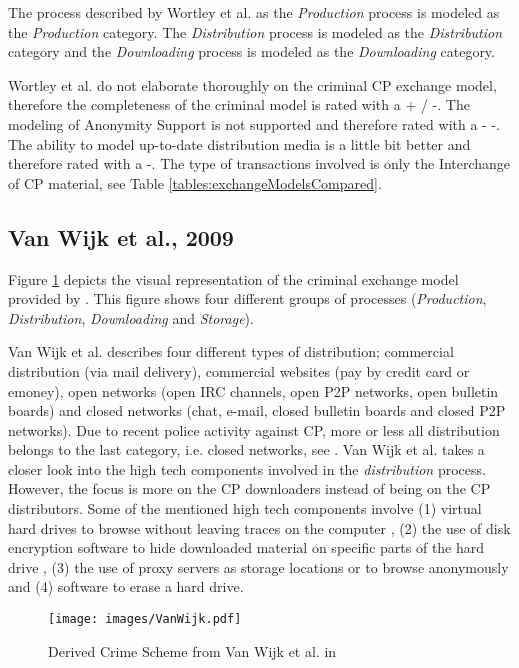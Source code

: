 \documentclass{sig-alternate-br}
\begin{document}
The process described by Wortley et al. as the \textit{Production} process is modeled as the \textit{Production} category. The \textit{Distribution} process is modeled as the \textit{Distribution} category and the \textit{Downloading} process is modeled as the \textit{Downloading} category.

Wortley et al. do not elaborate thoroughly on the criminal CP exchange model, therefore the completeness of the criminal model is rated with a + / -. The modeling of Anonymity Support is not supported and therefore rated with a - -. The ability to model up-to-date distribution media is a little bit better and therefore rated with a -.  The type of transactions involved is only the Interchange of CP material, see Table \ref{tables:exchangeModelsCompared}.

\subsection{Van Wijk et al., 2009 \cite{wijk2009achter}}
Figure \ref{fig:wijk_01} depicts the visual representation of the criminal exchange model provided by \cite{wijk2009achter}. This figure shows four different groups of processes (\textit{Production}, \textit{Distribution}, \textit{Downloading} and \textit{Storage}).

Van Wijk et al. \cite{wijk2009achter} describes four different types of distribution; commercial distribution (via mail delivery), commercial websites (pay by credit card or emoney), open networks (open IRC channels, open P2P networks, open bulletin boards) and closed networks (chat, e-mail, closed bulletin boards and closed P2P networks). Due to recent police activity against CP, more or less all distribution belongs to the last category, i.e. closed networks, see \cite{wortley2006child, callanan2009internet}. Van Wijk et al. takes a closer look into the high tech components involved in the \textit{distribution} process. However, the focus is more on the CP downloaders instead of being on the CP distributors. Some of the mentioned high tech components involve (1) virtual hard drives to browse without leaving traces on the computer \cite{site:VHD}, (2) the use of disk encryption software to hide downloaded material on specific parts of the hard drive \cite{site:diskenc}, (3) the use of proxy servers as storage locations or to browse anonymously \cite{site:proxy} and (4) software to erase a hard drive.

\begin{figure}[ht]
\centering
\texttt{[image: images/VanWijk.pdf]}
\caption{Derived Crime Scheme from Van Wijk et al. in \cite{wijk2009achter}}
\label{fig:wijk_01}
\end{figure}
\end{document}
